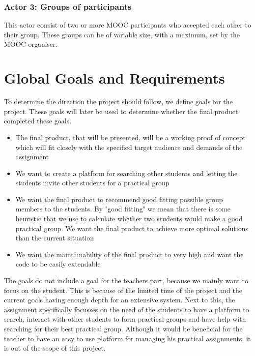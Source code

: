 \subsubsection{Actor 3: Groups of participants}
This actor consist of two or more MOOC participants who accepted each other to their group.
These groups can be of variable size, with a maximum, set by the MOOC organiser.

\section{Global Goals and Requirements}
To determine the direction the project should follow, we define goals for the project.
These goals will later be used to determine whether the final product completed these goals.
\begin{itemize}
\item The final product, that will be presented, will be a working proof of concept which will fit closely with the specified target audience and demands of the assignment
\item We want to create a platform for searching other students and letting the students invite other students for a practical group
\item We want the final product to recommend good fitting possible group members to the students.
By "good fitting" we mean that there is some heuristic that we use to calculate whether two students would make a good practical group.
We want the final product to achieve more optimal solutions than the current situation
\item We want the maintainability of the final product to very high and want the code to be easily extendable
\end{itemize}

The goals do not include a goal for the teachers part, because we mainly want to focus on the student.
This is because of the limited time of the project and the current goals having enough depth for an extensive system.
Next to this, the assignment specifically focusses on the need of the students to have a platform to search, interact with other students to form practical groups and have help with searching for their best practical group.
Although it would be beneficial for the teacher to have an easy to use platform for managing his practical assignments, it is out of the scope of this project.

